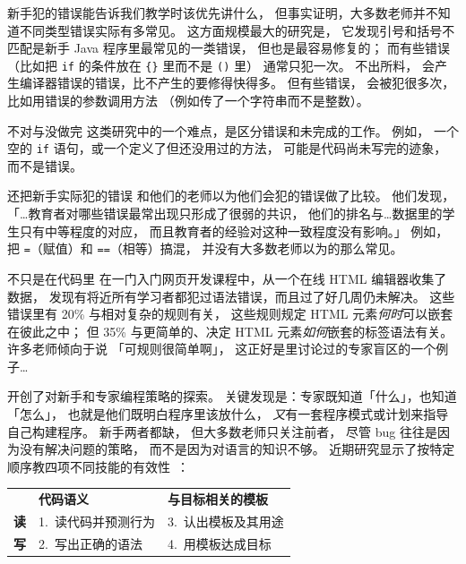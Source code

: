 
新手犯的错误能告诉我们教学时该优先讲什么，
但事实证明，大多数老师并不知道不同类型错误实际有多常见。
这方面规模最大的研究是\cite{Brow2017}，
它发现引号和括号不匹配是新手 Java 程序里最常见的一类错误，
但也是最容易修复的；
而有些错误（比如把 \texttt{if} 的条件放在 \texttt{\{\}} 里而不是 \texttt{()} 里）
通常只犯一次。
不出所料，
会产生编译器错误的错误，比不产生的要修得快得多。
但有些错误，
会被犯很多次，
比如用错误的参数调用方法
（例如传了一个字符串而不是整数）。

\begin{aside}{不对与没做完}
  这类研究中的一个难点，是区分错误和未完成的工作。
  例如，
  一个空的 \texttt{if} 语句，或一个定义了但还没用过的方法，
  可能是代码尚未写完的迹象，而不是错误。
\end{aside}

\cite{Brow2017}还把新手实际犯的错误
和他们的老师以为他们会犯的错误做了比较。
他们发现，
「{\ldots}教育者对哪些错误最常出现只形成了很弱的共识，
他们的排名与{\ldots}数据里的学生只有中等程度的对应，
而且教育者的经验对这种一致程度没有影响。」
例如，
把 \texttt{=}（赋值）和 \texttt{==}（相等）搞混，
并没有大多数老师以为的那么常见。

\begin{aside}{不只是在代码里}
  \cite{Park2015}在一门入门网页开发课程中，从一个在线 HTML 编辑器收集了数据，
  发现有将近所有学习者都犯过语法错误，而且过了好几周仍未解决。
  这些错误里有 20\% 与相对复杂的规则有关，
  这些规则规定 HTML 元素\emph{何时}可以嵌套在彼此之中；
  但 35\% 与更简单的、决定 HTML 元素\emph{如何}嵌套的标签语法有关。
  许多老师倾向于说
  「可规则很简单啊」，
  这正好是里讨论过的专家盲区的一个例子{\ldots}
\end{aside}


\cite{Solo1984,Solo1986}开创了对新手和专家编程策略的探索。
关键发现是：专家既知道「什么」，也知道「怎么」，
也就是他们既明白程序里该放什么，
\emph{又}有一套程序模式或计划来指导自己构建程序。
新手两者都缺，
但大多数老师只关注前者，
尽管 bug 往往是因为没有解决问题的策略，
而不是因为对语言的知识不够。
近期研究显示了按特定顺序教四项不同技能的有效性~\cite{Xie2019}：

\begin{longtable}{lll}
&	\textbf{代码语义}&	\textbf{与目标相关的模板}	\\
\textbf{读}&	1.\ 读代码并预测行为&	3.\ 认出模板及其用途	\\
\textbf{写}&	2.\ 写出正确的语法&	4.\ 用模板达成目标
\end{longtable}


